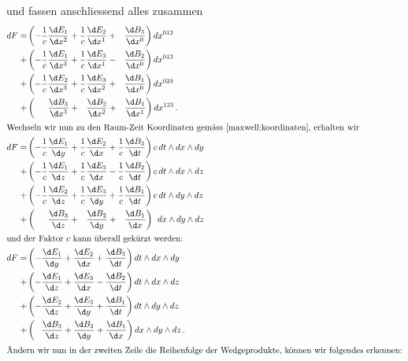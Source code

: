 und fassen anschliessend alles zusammen
\begin{align*}
	dF =
	&\left( - \frac{1}{c} \frac{\d E_1}{\d x^2} + \frac{1}{c} \frac{\d E_2}{\d x^1} + \phantom{\frac{1}{c}} \frac{\d B_3}{\d x^0} \right) dx^{012}
	\\
	+&\left( - \frac{1}{c} \frac{\d E_1}{\d x^3} + \frac{1}{c} \frac{\d E_3}{\d x^1} - \phantom{\frac{1}{c}} \frac{\d B_2}{\d x^0} \right) dx^{013}
	\\
	+&\left( - \frac{1}{c} \frac{\d E_2}{\d x^3} + \frac{1}{c} \frac{\d E_3}{\d x^2} + \phantom{\frac{1}{c}} \frac{\d B_1}{\d x^0} \right) dx^{023}
	\\
	+&\left( \phantom{+} \phantom{\frac{1}{c}} \frac{\d B_3}{\d x^3} + \phantom{\frac{1}{c}} \frac{\d B_2}{\d x^2} + \phantom{\frac{1}{c}} \frac{\d B_1}{\d x^1} \right) dx^{123} \, .
	\\
	\intertext{Wechseln wir nun zu den Raum-Zeit Koordinaten gemäss \eqref{maxwell:koordinaten}, erhalten wir}
	dF =
	&\left( - \frac{1}{c} \frac{\d E_1}{\d y} + \frac{1}{c} \frac{\d E_2}{\d x} + \frac{1}{c} \frac{\d B_3}{\d t} \right) c \, dt \wedge dx \wedge dy
	\\
	+&\left( - \frac{1}{c} \frac{\d E_1}{\d z} + \frac{1}{c} \frac{\d E_3}{\d x} - \frac{1}{c} \frac{\d B_2}{\d t} \right) c \, dt \wedge dx \wedge dz
	\\
	+&\left( - \frac{1}{c} \frac{\d E_2}{\d z} + \frac{1}{c} \frac{\d E_3}{\d y} + \frac{1}{c} \frac{\d B_1}{\d t} \right) c\, dt \wedge dy \wedge dz
	\\
	+&\left( \phantom{+} \phantom{\frac{1}{c}} \frac{\d B_3}{\d z} + \phantom{\frac{1}{c}} \frac{\d B_2}{\d y} + \phantom{\frac{1}{c}} \frac{\d B_1}{\d x} \right) \phantom{c} dx \wedge dy \wedge dz
	\\
	\intertext{und der Faktor $c$ kann überall gekürzt werden:}
	dF =
	&\left( -  \frac{\d E_1}{\d y} +  \frac{\d E_2}{\d x} +  \frac{\d B_3}{\d t} \right) dt \wedge dx \wedge dy
	\\
	+&\left( -  \frac{\d E_1}{\d z} +  \frac{\d E_3}{\d x} -  \frac{\d B_2}{\d t} \right)dt \wedge dx \wedge dz
	\\
	+&\left( -  \frac{\d E_2}{\d z} +  \frac{\d E_3}{\d y} +  \frac{\d B_1}{\d t} \right)dt \wedge dy \wedge dz
	\\
	+&\left( \phantom{+}  \frac{\d B_3}{\d z} +  \frac{\d B_2}{\d y} +  \frac{\d B_1}{\d x} \right) dx \wedge dy \wedge dz \, .
	\\
	\intertext{Ändern wir nun in der zweiten Zeile die Reihenfolge der Wedgeprodukte, können wir folgendes erkennen:}

\end{align*}
